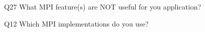 \begin{description}%
\item{Q27} What MPI feature(s) are NOT useful for you application?%
\item{Q12} Which MPI implementations do you use?%
\end{description}%

